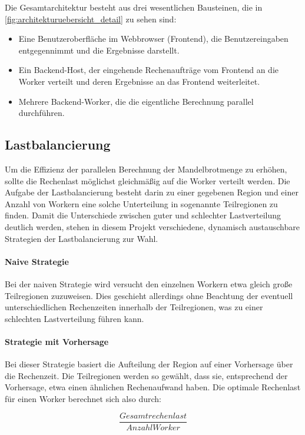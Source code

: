 Die Gesamtarchitektur besteht aus drei wesentlichen Bausteinen, die in \autoref{fig:architekturuebersicht_detail} zu sehen sind:
\begin{itemize}
	\item Eine Benutzeroberfläche im Webbrowser (Frontend), die Benutzereingaben entgegennimmt und die Ergebnisse darstellt.
	\item Ein Backend-Host, der eingehende Rechenaufträge vom Frontend an die Worker verteilt und deren Ergebnisse an das Frontend weiterleitet.
	\item Mehrere Backend-Worker, die die eigentliche Berechnung parallel durchführen.
\end{itemize}

\subsection{Lastbalancierung}\label{sec:load_balancing_concepts}
Um die Effizienz der parallelen Berechnung der Mandelbrotmenge zu erhöhen, sollte die Rechenlast möglichst gleichmäßig auf die Worker verteilt werden.
Die Aufgabe der Lastbalancierung besteht darin zu einer gegebenen Region und einer Anzahl von Workern eine solche Unterteilung in sogenannte Teilregionen zu finden.
Damit die Unterschiede zwischen guter und schlechter Lastverteilung deutlich werden, stehen in diesem Projekt verschiedene, dynamisch austauschbare Strategien der Lastbalancierung zur Wahl.

\paragraph{Naive Strategie}
Bei der naiven Strategie wird versucht den einzelnen Workern etwa gleich große Teilregionen zuzuweisen.
Dies geschieht allerdings ohne Beachtung der eventuell unterschiedlichen Rechenzeiten innerhalb der Teilregionen, was zu einer schlechten Lastverteilung führen kann.

\paragraph{Strategie mit Vorhersage}
Bei dieser Strategie basiert die Aufteilung der Region auf einer Vorhersage über die Rechenzeit.
Die Teilregionen werden so gewählt, dass sie, entsprechend der Vorhersage, etwa einen ähnlichen Rechenaufwand haben.
Die optimale Rechenlast für einen Worker berechnet sich also durch:

\begin{equation}\label{equ:desiredN}
	\frac{Gesamtrechenlast}{AnzahlWorker}
\end{equation}


